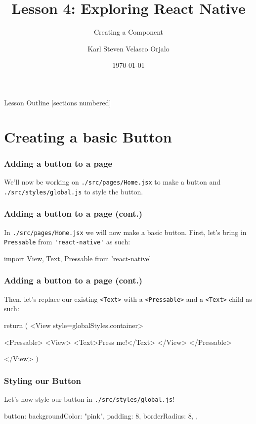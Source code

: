 \documentclass{beamer}
\title{Lesson 4: Exploring React Native}
\subtitle{Creating a Component}
\date{\today}
\author{Karl Steven Velasco Orjalo}
\institute{React Native Quickstart}
\begin{document}
  \maketitle

  \begin{frame}{Lesson Outline}
    [sections numbered]
    \tableofcontents
  \end{frame}

  \section{Creating a basic Button}
  \begin{frame}[fragile]
    \frametitle{Adding a button to a page}
    We'll now be working on \verb|./src/pages/Home.jsx| to make a button and \verb|./src/styles/global.js| to style the button. 
  \end{frame}
  \begin{frame}[fragile]
    \frametitle{Adding a button to a page (cont.)}
    In \verb|./src/pages/Home.jsx| we will now make a basic button. 
    First, let's bring in \verb|Pressable| from \verb|'react-native'| as such: 

    \begin{jscodesmall}
import {View, Text, Pressable} from 'react-native'
    \end{jscodesmall}
  \end{frame}
  \begin{frame}[fragile]
    \frametitle{Adding a button to a page (cont.)}
    Then, let's replace our existing \verb|<Text>| with a \verb|<Pressable>| and a \verb|<Text>| child as such: 

    \begin{jscodesmall}
return (
  <View style={globalStyles.container}>

    <Pressable>
        <View>
          <Text>Press me!</Text>
        </View>
    </Pressable>

  </View>
)
    \end{jscodesmall}
  \end{frame}
  \begin{frame}[fragile]
    \frametitle{Styling our Button}
    Let's now style our button in \verb|./src/styles/global.js|!

    \vspace{0.5cm}
    \begin{jscodesmall}
button: {
  backgroundColor: "pink",
  padding: 8,
  borderRadius: 8,
},
    \end{jscodesmall}
  \end{frame}
\end{document}
